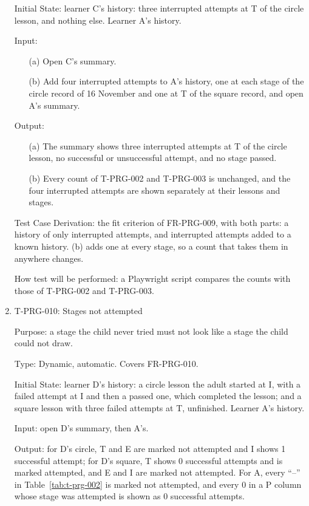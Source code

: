 \documentclass[12pt, titlepage]{article}
\newcommand{\testitem}[1]{\item #1\par\nopagebreak}
\begin{document}
\begin{enumerate}
Initial State: learner C's history: three interrupted attempts at T of the
circle lesson, and nothing else. Learner A's history.

Input:
\begin{itemize}
\item[(a)] Open C's summary.
\item[(b)] Add four interrupted attempts to A's history, one at each stage
of the circle record of 16 November and one at T of the square record, and
open A's summary.
\end{itemize}

Output:
\begin{itemize}
\item[(a)] The summary shows three interrupted attempts at T of the circle
lesson, no successful or unsuccessful attempt, and no stage passed.
\item[(b)] Every count of T-PRG-002 and T-PRG-003 is unchanged, and the four
interrupted attempts are shown separately at their lessons and stages.
\end{itemize}

Test Case Derivation: the fit criterion of FR-PRG-009, with both parts: a
history of only interrupted attempts, and interrupted attempts added to a
known history. (b) adds one at every stage, so a count that takes them in
anywhere changes.

How test will be performed: a Playwright script compares the counts with
those of T-PRG-002 and T-PRG-003.

\testitem{T-PRG-010: Stages not attempted}

Purpose: a stage the child never tried must not look like a stage the child
could not draw.

Type: Dynamic, automatic. Covers FR-PRG-010.

Initial State: learner D's history: a circle lesson the adult started at I,
with a failed attempt at I and then a passed one, which completed the
lesson; and a square lesson with three failed
attempts at T, unfinished. Learner A's history.

Input: open D's summary, then A's.

Output: for D's circle, T and E are marked not attempted and I shows 1
successful attempt; for D's square, T shows 0 successful attempts and is
marked attempted, and E and I are marked not attempted. For A, every ``--''
in Table~\ref{tab:t-prg-002} is marked not attempted, and every 0 in a P
column whose stage was attempted is shown as 0 successful attempts.


\end{enumerate}
\end{document}
